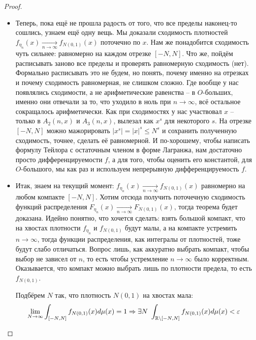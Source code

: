 \begin{proof}
\begin{itemize}
        \item Теперь, пока ещё не прошла радость от того, что все пределы наконец-то сошлись, узнаем ещё одну вещь. Мы доказали сходимость плотностей $f_{\eta_n}(x) \xrightarrow[n \to \infty]{} f_{N(0, 1)}(x)$ поточечно по $x$. Нам же понадобится сходимость чуть сильнее: равномерно на каждом отрезке $[-N, N]$. Что же, пойдём расписывать заново все пределы и проверять равномерную сходимость (нет). Формально расписывать это не будем, но понять, почему именно на отрезках и почему сходимость равномерная, не слишком сложно. Где вообще у нас появлялись сходимости, а не арифметические равенства -- в $O$-больших, именно они отвечали за то, что уходило в ноль при $n \to \infty$, всё остальное сокращалось арифметически. Как при сходимостях у нас участвовал $x$ -- только в $A_2(n, x)$ и $A_3(n, x)$, вылезал как $x^s$ для некоторого $s$. На отрезке $[-N, N]$ можно мажорировать $|x^s| = |x|^s \le N^s$ и сохранить полученную сходимость, точнее, сделать её равномерной. И по-хорошему, чтобы написать формулу Тейлора с остаточным членом в форме Лагранжа, нам достаточно просто дифференцируемости $f$, а для того, чтобы оценить его константой, для $O$-большого, мы как раз и используем непрерывную дифференцируемость $f$.

        \item Итак, знаем на текущий момент: $f_{\eta_n}(x) \xrightarrow[n \to \infty]{} f_{N(0, 1)}(x)$ равномерно на любом компакте $[-N, N]$. Хотим отсюда получить поточечную сходимость функций распределения $F_{\eta_n}(x) \xrightarrow[n \to \infty]{} F_{N(0, 1)}(x)$, тогда теорема будет доказана. Идейно понятно, что хочется сделать: взять большой компакт, что на хвостах плотности $f_{\eta_n}$ и $f_{N(0, 1)}$ будут малы, а на компакте устремить $n \to \infty$, тогда функции распределения, как интегралы от плотностей, тоже будут слабо отличаться. Вопрос лишь, как аккуратно выбрать компакт, чтобы выбор не зависел от $n$, то есть чтобы устремление $n \to \infty$ было корректным. Оказывается, что компакт можно выбрать лишь по плотности предела, то есть $f_{N(0, 1)}$.

        Подбёрем $N$ так, что плотность $N(0, 1)$ на хвостах мала:
        \[
            \lim_{N \to \infty} \int_{[-N, N]} f_{N(0, 1)}(x) d\mu(x) = 1 \Rightarrow \exists N \ \int_{\mathbb{R} \setminus [-N, N]} f_{N(0, 1)}(x) d\mu(x) < \varepsilon
        \]


\end{itemize}
\end{proof}
